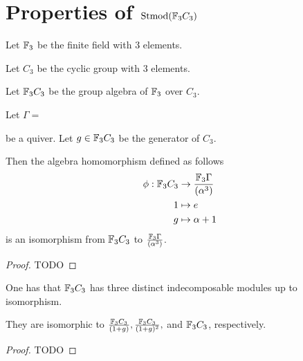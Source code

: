 \section{Properties of \texorpdfstring{\( \operatorname{Stmod}({\mathbb{F}}_3 C_3) \)}{Stmod(F\_3C\_3)}} %


\begin{definition}
    Let \( {\mathbb{F}}_3 \) be the finite field with \( 3 \) elements.
\end{definition}

\begin{definition}
    Let \( C_3 \) be the cyclic group with \( 3 \) elements.
\end{definition}

\begin{definition}
    Let \( {\mathbb{F}}_3 C_3 \) be the group algebra of \( {\mathbb{F}}_3 \) over \( C_3 \).
\end{definition}

\begin{theorem}
    Let \( \Gamma = \)
    be a quiver.
    Let \( g \in {\mathbb{F}}_3 C_3 \) be the generator of \( C_3 \).
    
    Then the algebra homomorphism defined as follows
    \begin{align*}
        \phi: {\mathbb{F}}_3 C_3 &\to \frac{{\mathbb{F}}_3\Gamma}{(\alpha^3)} \\
        1 &\mapsto e \\
        g &\mapsto \alpha + 1
    \end{align*}
    is an isomorphism from \( {\mathbb{F}}_3 C_3 \) to \( \frac{{\mathbb{F}}_3\Gamma}{(\alpha^3)} \).    
\end{theorem}
\begin{proof}
    TODO
\end{proof}

\begin{theorem}
    One has that \( {\mathbb{F}}_3 C_3 \) has three distinct indecomposable modules up to isomorphism.
    
    They are isomorphic to \( \frac{{\mathbb{F}}_3C_3}{(1 + g)}, \frac{{\mathbb{F}}_3C_3}{(1 + g)^2}, \) and \( {\mathbb{F}}_3C_3 \), respectively.
\end{theorem}
\begin{proof}
    TODO
\end{proof}

